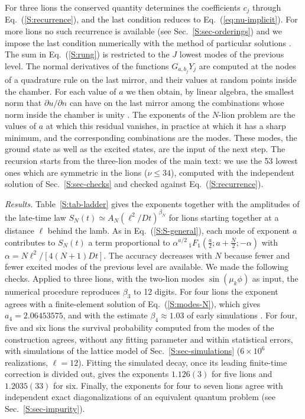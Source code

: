 For three lions the conserved quantity determines the coefficients $c_j$ through Eq.~(\ref{S:recurrence}), and the last condition reduces to Eq.~(\ref{eq:nu-implicit}). For more lions no such recurrence is available (see Sec.~\ref{S:sec-orderings}) and we impose the last condition numerically with the method of particular solutions \cite{FHM67,BT05}. The sum in Eq.~(\ref{S:rung}) is restricted to the $J$ lowest modes of the previous level. The normal derivatives of the functions $G_{a, b_j} Y_j$ are computed at the nodes of a quadrature rule on the last mirror, and their values at random points inside the chamber. For each value of $a$ we then obtain, by linear algebra, the smallest norm that $\partial u/\partial n$ can have on the last mirror among the combinations whose norm inside the chamber is unity \cite{BT05}. The exponents of the $N$-lion problem are the values of $a$ at which this residual vanishes, in practice at which it has a sharp minimum, and the corresponding combinations are the modes. These modes, the ground state as well as the excited states, are the input of the next step. The recursion starts from the three-lion modes of the main text: we use the 53 lowest ones which are symmetric in the lions ($\nu \leq 34$), computed with the independent solution of Sec.~\ref{S:sec-checks} and checked against Eq.~(\ref{S:recurrence}).

\emph{Results.} Table~\ref{S:tab-ladder} gives the exponents together with the amplitudes of the late-time law $S_N(t) \simeq A_N (\ell^2/Dt)^{\beta_N}$ for lions starting together at a distance $\ell$ behind the lamb. As in Eq.~(\ref{S:S-general}), each mode of exponent $a$ contributes to $S_N(t)$ a term proportional to $\alpha^{a/2} \,_1F_1(\frac{a}{2}; a + \frac{N}{2}; -\alpha)$ with $\alpha = N \ell^2/[4 (N+1) D t]$. The accuracy decreases with $N$ because fewer and fewer excited modes of the previous level are available. We made the following checks. Applied to three lions, with the two-lion modes $\sin (\mu_k \phi)$ as input, the numerical procedure reproduces $\beta_3$ to 12 digits. For four lions the exponent agrees with a finite-element solution of Eq.~(\ref{S:modes-N}), which gives $a_4 = 2.06453575$, and with the estimate $\beta_4 \approx 1.03$ of early simulations \cite{BG91,KR96,RK99}. For four, five and six lions the survival probability computed from the modes of the construction agrees, without any fitting parameter and within statistical errors, with simulations of the lattice model of Sec.~\ref{S:sec-simulations} ($6 \times 10^6$ realizations, $\ell = 12$). Fitting the simulated decay, once its leading finite-time correction is divided out, gives the exponents $1.126(3)$ for five lions and $1.2035(33)$ for six. Finally, the exponents for four to seven lions agree with independent exact diagonalizations of an equivalent quantum problem (see Sec.~\ref{S:sec-impurity}).

